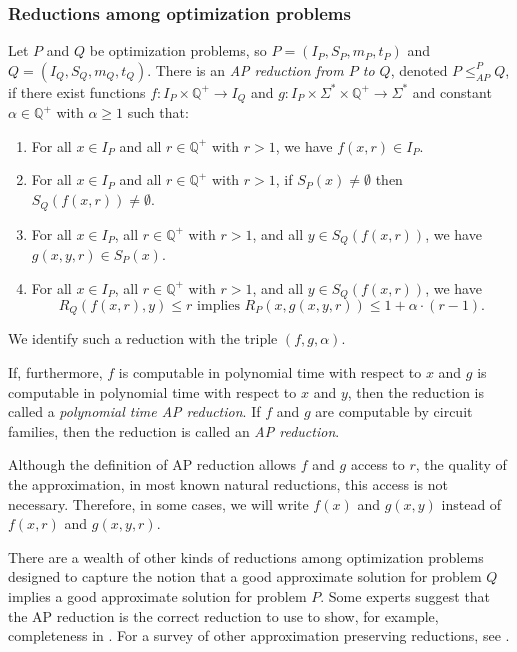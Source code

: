 \documentclass[]{article}
\newcommand{\APr}{\leq_{AP}^{P}}
\begin{document}
\subsubsection{Reductions among optimization problems}

\begin{definition}
  Let $P$ and $Q$ be optimization problems, so $P = (I_P, S_P, m_P, t_P)$ and $Q = (I_Q, S_Q, m_Q, t_Q)$.
  There is an \emph{AP reduction from $P$ to $Q$}, denoted $P \APr Q$, if there exist functions $f \colon I_P \times \mathbb{Q}^+ \to I_Q$ and $g \colon I_P \times \Sigma^* \times \mathbb{Q}^+ \to \Sigma^*$ and constant $\alpha \in \mathbb{Q}^+$ with $\alpha \geq 1$ such that:
  \begin{enumerate}
  \item For all $x \in I_P$ and all $r \in \mathbb{Q}^+$ with $r > 1$, we have $f(x, r) \in I_P$.
  \item For all $x \in I_P$ and all $r \in \mathbb{Q}^+$ with $r > 1$, if $S_P(x) \neq \emptyset$ then $S_Q(f(x, r)) \neq \emptyset$.
  \item For all $x \in I_P$, all $r \in \mathbb{Q}^+$ with $r > 1$, and all $y \in S_Q(f(x, r))$, we have $g(x, y, r) \in S_P(x)$.
  \item For all $x \in I_P$, all $r \in \mathbb{Q}^+$ with $r > 1$, and all $y \in S_Q(f(x, r))$, we have
    \begin{equation*}
      R_Q(f(x, r), y) \leq r \text{ implies } R_P(x, g(x, y, r)) \leq 1 + \alpha \cdot (r - 1).
    \end{equation*}
  \end{enumerate}
  We identify such a reduction with the triple $(f, g, \alpha)$.

  If, furthermore, $f$ is computable in polynomial time with respect to $x$ and $g$ is computable in polynomial time with respect to $x$ and $y$, then the reduction is called a \emph{polynomial time AP reduction}.
  If $f$ and $g$ are computable by \FNC{} circuit families, then the reduction is called an \emph{\NC{} AP reduction}.
\end{definition}

Although the definition of AP reduction allows $f$ and $g$ access to $r$, the quality of the approximation, in most known natural reductions, this access is not necessary.
Therefore, in some cases, we will write $f(x)$ and $g(x, y)$ instead of $f(x, r)$ and $g(x, y, r)$.

There are a wealth of other kinds of reductions among optimization problems designed to capture the notion that a good approximate solution for problem $Q$ implies a good approximate solution for problem $P$.
Some experts suggest that the AP reduction is the correct reduction to use to show, for example, completeness in \APX.
For a survey of other approximation preserving reductions, see \cite{crescenzi97}.
\end{document}
